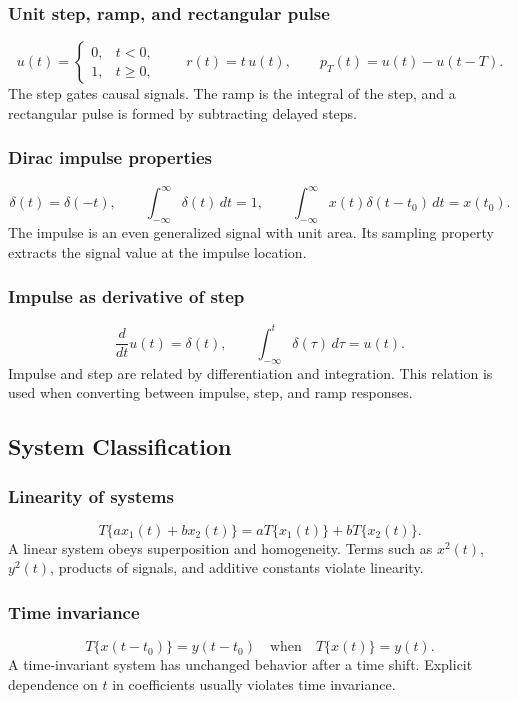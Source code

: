 \subsubsection{Unit step, ramp, and rectangular pulse}
\[
u(t)=
\begin{cases}
0, & t<0,\\
1, & t\geq 0,
\end{cases}
\qquad
r(t)=t\,u(t),
\qquad
p_T(t)=u(t)-u(t-T).
\]
The step gates causal signals. The ramp is the integral of the step, and a rectangular pulse is formed by subtracting delayed steps.

\subsubsection{Dirac impulse properties}
\[
\delta(t)=\delta(-t), \qquad
\int_{-\infty}^{\infty}\delta(t)\,dt=1, \qquad
\int_{-\infty}^{\infty}x(t)\delta(t-t_0)\,dt=x(t_0).
\]
The impulse is an even generalized signal with unit area. Its sampling property extracts the signal value at the impulse location.

\subsubsection{Impulse as derivative of step}
\[
\frac{d}{dt}u(t)=\delta(t), \qquad
\int_{-\infty}^{t}\delta(\tau)\,d\tau=u(t).
\]
Impulse and step are related by differentiation and integration. This relation is used when converting between impulse, step, and ramp responses.

\subsection{System Classification}

\subsubsection{Linearity of systems}
\[
T\{a x_1(t)+b x_2(t)\}=aT\{x_1(t)\}+bT\{x_2(t)\}.
\]
A linear system obeys superposition and homogeneity. Terms such as \(x^2(t)\), \(y^2(t)\), products of signals, and additive constants violate linearity.

\subsubsection{Time invariance}
\[
T\{x(t-t_0)\}=y(t-t_0) \quad \text{when} \quad T\{x(t)\}=y(t).
\]
A time-invariant system has unchanged behavior after a time shift. Explicit dependence on \(t\) in coefficients usually violates time invariance.

